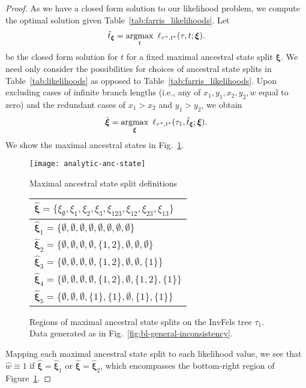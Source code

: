 \begin{proof}
As we have a closed form solution to our likelihood problem, we compute the optimal solution given Table~\ref{tab:farris_likelihoods}.
Let
\[
\hat{t}_{\boldsymbol\xi} = \operatorname*{argmax}_{t} \ \ell_{\tau^*,t^*}(\tau, t; \boldsymbol\xi).
\]
be the closed form solution for $t$ for a fixed maximal ancestral state split $\boldsymbol\xi$.
We need only consider the possibilities for choices of ancestral state splits in Table~\ref{tab:likelihoods} as opposed to Table~\ref{tab:farris_likelihoods}.
Upon excluding cases of infinite branch lengths (i.e., any of $x_1,y_1,x_2,y_2,w$ equal to zero) and the redundant cases of $x_1 > x_2$ and $y_1 > y_2$, we obtain
\[
\hat{\boldsymbol\xi} =
    \operatorname*{argmax}_{\boldsymbol\xi} \ \ell_{\tau^*,t^*}(\tau_1, \hat{t}_{\boldsymbol\xi}; \boldsymbol\xi).
\]
We show the maximal ancestral states in Fig.~\ref{fig:max-anc-state}.

\begin{figure}
    \begin{minipage}{\linewidth}
        \centering
        \texttt{[image: analytic-anc-state]}
        \label{ }
    \end{minipage}
    \begin{minipage}{\linewidth}
        \centering
        Maximal ancestral state split definitions
        \begin{tabular}{l}
        \hline
        $\hat{\boldsymbol\xi} = \{\xi_{\emptyset},\xi_{1},\xi_{2},\xi_{3},\xi_{123},\xi_{12},\xi_{23},\xi_{13}\}$\\
        \hline
        $\hat{\boldsymbol\xi}_1 = \{\emptyset,\emptyset,\emptyset,\emptyset,\emptyset,\emptyset,\emptyset,\emptyset\}$\\
        $\hat{\boldsymbol\xi}_2 = \{\emptyset,\emptyset,\emptyset,\emptyset,\{1,2\},\emptyset,\emptyset,\emptyset\}$\\
        $\hat{\boldsymbol\xi}_3 = \{\emptyset,\emptyset,\emptyset,\emptyset,\{1,2\},\emptyset,\emptyset,\{1\}\}$\\
        $\hat{\boldsymbol\xi}_4 = \{\emptyset,\emptyset,\emptyset,\emptyset,\{1,2\},\emptyset,\{1,2\},\{1\}\}$\\
        $\hat{\boldsymbol\xi}_5 = \{\emptyset,\emptyset,\emptyset,\{1\},\{1\},\emptyset,\{1\},\{1\}\}$\\
        \hline
        \end{tabular}
    \end{minipage}
\caption{
Regions of maximal ancestral state splits on the InvFels tree $\tau_1$.
Data generated as in Fig.~\ref{fig:bl-general-inconsistency}.
}
\label{fig:max-anc-state}
\end{figure}

Mapping each maximal ancestral state split to each likelihood value, we see that $\hat{w}\equiv 1$ if $\hat{\boldsymbol\xi}=\hat{\boldsymbol\xi}_1$ or $\hat{\boldsymbol\xi}=\hat{\boldsymbol\xi}_2$, which encompasses the bottom-right region of Figure~\ref{fig:max-anc-state}.
\end{proof}

